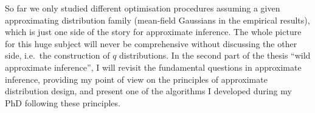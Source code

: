 So far we only studied different optimisation procedures assuming a given approximating distribution family (mean-field Gaussians in the empirical results), which is just one side of the story for approximate inference. The whole picture for this huge subject will never be comprehensive without discussing the other side, i.e.~the construction of $q$ distributions. In the second part of the thesis ``wild approximate inference'', I will revisit the fundamental questions in approximate inference, providing my point of view on the principles of approximate distribution design, and present one of the algorithms I developed during my PhD following these principles.



